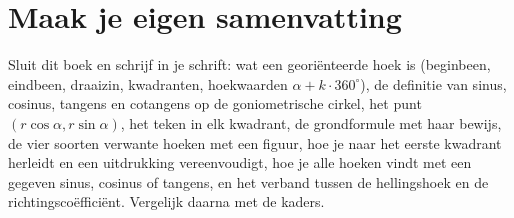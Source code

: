 \section*{Maak je eigen samenvatting}
Sluit dit boek en schrijf in je schrift: wat een georiënteerde hoek is (beginbeen, eindbeen, draaizin, kwadranten, hoekwaarden $\alpha + k \cdot 360^\circ$), de definitie van sinus, cosinus, tangens en cotangens op de goniometrische cirkel, het punt $(r\cos\alpha, r\sin\alpha)$, het teken in elk kwadrant, de grondformule met haar bewijs, de vier soorten verwante hoeken met een figuur, hoe je naar het eerste kwadrant herleidt en een uitdrukking vereenvoudigt, hoe je alle hoeken vindt met een gegeven sinus, cosinus of tangens, en het verband tussen de hellingshoek en de richtingscoëfficiënt. Vergelijk daarna met de kaders.
\fi
